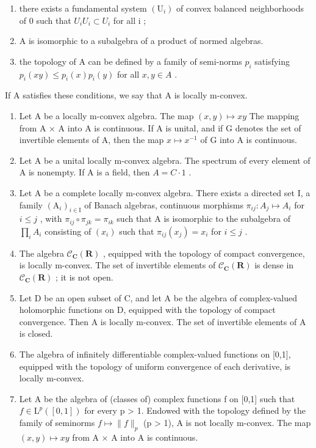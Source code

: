 \begin{enumerate}
\def\labelenumi{(\roman{enumi})}
\item
  there exists a fundamental system \((\mathrm{U}_{i})\) of convex balanced neighborhoods of 0 such that \(U_{i}U_{i} \subset U_{i}\) for all i ;
\item
  A is isomorphic to a subalgebra of a product of normed algebras.
\item
  the topology of A can be defined by a family of semi-norms \(p_{i}\) satisfying \(p_{i}(xy) \leqslant p_{i}(x)p_{i}(y)\) for all \(x, y \in A\) .
\end{enumerate}

If A satisfies these conditions, we say that A is locally m-convex.

\begin{enumerate}
\def\labelenumi{\alph{enumi})}
\setcounter{enumi}{1}
\item
  Let A be a locally m-convex algebra. The map \((x,y)\mapsto xy\) The mapping from A × A into A is continuous. If A is unital, and if G denotes the set of invertible elements of A, then the map \(x\mapsto x^{-1}\) of G into A is continuous.
\item
  Let A be a unital locally m-convex algebra. The spectrum of every element of A is nonempty. If A is a field, then \(A = C \cdot 1\) .
\item
  Let A be a complete locally m-convex algebra. There exists a directed set I, a family \((\mathrm{A}_{i})_{i\in\mathrm{I}}\) of Banach algebras, continuous morphisms \(\pi_{ij}\colon A_{j}\mapsto A_{i}\) for \(i\leqslant j\) , with \(\pi_{ij}\circ\pi_{jk}=\pi_{ik}\) such that A is isomorphic to the subalgebra of \(\prod_{i}A_{i}\) consisting of \((x_{i})\) such that \(\pi_{ij}(x_{j})=x_{i}\) for \(i\leqslant j\) .
\item
  The algebra \(\mathcal{C}_{\mathbf{C}}(\mathbf{R})\) , equipped with the topology of compact convergence, is locally m-convex. The set of invertible elements of \(\mathcal{C}_{\mathbf{C}}(\mathbf{R})\) is dense in \(\mathcal{C}_{\mathbf{C}}(\mathbf{R})\) ; it is not open.
\item
  Let D be an open subset of C, and let A be the algebra of complex-valued holomorphic functions on D, equipped with the topology of compact convergence. Then A is locally m-convex. The set of invertible elements of A is closed.
\item
  The algebra of infinitely differentiable complex-valued functions on {[}0,1{]}, equipped with the topology of uniform convergence of each derivative, is locally m-convex.
\item
  Let A be the algebra of (classes of) complex functions f on {[}0,1{]} such that \(f \in \mathrm{L}^{p}([0,1])\) for every p \textgreater{} 1. Endowed with the topology defined by the family of seminorms \(f \mapsto \|f\|_{p}\) (p \textgreater{} 1), A is not locally m-convex. The map \((x,y) \mapsto xy\) from A × A into A is continuous.
\end{enumerate}

